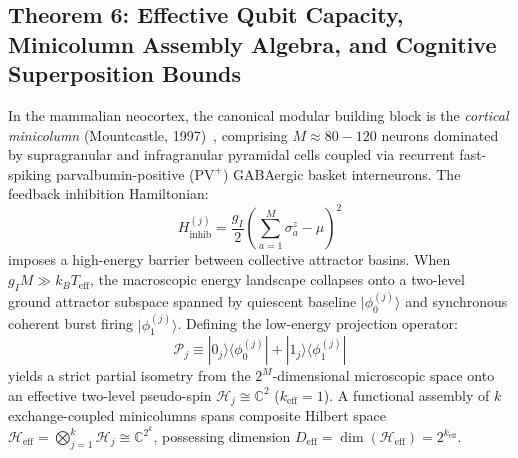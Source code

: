 \documentclass[10pt,twocolumn,3p]{article}
\begin{document}
\subsection{Theorem 6: Effective Qubit Capacity, Minicolumn Assembly Algebra, and Cognitive Superposition Bounds}
\label{subsec:thm_qubit_capacity}

In the mammalian neocortex, the canonical modular building block is the \textit{cortical minicolumn} (Mountcastle, 1997)~\cite{mountcastle1997}, comprising $M \approx 80 - 120$ neurons dominated by supragranular and infragranular pyramidal cells coupled via recurrent fast-spiking parvalbumin-positive ($\text{PV}^+$) GABAergic basket interneurons. The feedback inhibition Hamiltonian:
\begin{equation}
    H_{\text{inhib}}^{(j)} = \frac{g_I}{2} \left( \sum_{a=1}^M \sigma_a^z - \mu \right)^2
\end{equation}
imposes a high-energy barrier between collective attractor basins. When $g_I M \gg k_B T_{\text{eff}}$, the macroscopic energy landscape collapses onto a two-level ground attractor subspace spanned by quiescent baseline $|\phi_0^{(j)}\rangle$ and synchronous coherent burst firing $|\phi_1^{(j)}\rangle$. Defining the low-energy projection operator:
\begin{equation}
    \mathcal{P}_j \equiv |0_j\rangle\langle \phi_0^{(j)}| + |1_j\rangle\langle \phi_1^{(j)}|
\end{equation}
yields a strict partial isometry from the $2^M$-dimensional microscopic space onto an effective two-level pseudo-spin $\mathcal{H}_j \cong \mathbb{C}^2$ ($k_{\text{eff}} = 1$). A functional assembly of $k$ exchange-coupled minicolumns spans composite Hilbert space $\mathcal{H}_{\text{eff}} = \bigotimes_{j=1}^k \mathcal{H}_j \cong \mathbb{C}^{2^k}$, possessing dimension $D_{\text{eff}} = \dim(\mathcal{H}_{\text{eff}}) = 2^{k_{\text{eff}}}$.
\end{document}
